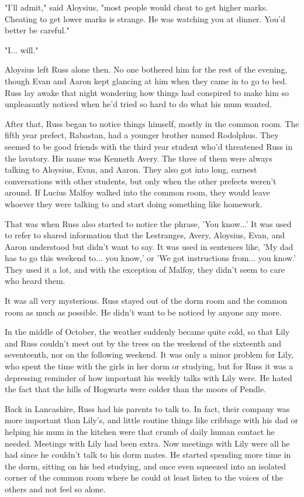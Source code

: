 \documentclass[a4paper,11pt]{article}
\begin{document}
"I'll admit," said Aloysius, "most people would cheat to get higher marks. Cheating to get lower marks is strange. He was watching you at dinner. You'd better be careful."

"I... will."

Aloysius left Russ alone then. No one bothered him for the rest of the evening, though Evan and Aaron kept glancing at him when they came in to go to bed. Russ lay awake that night wondering how things had conspired to make him so unpleasantly noticed when he'd tried so hard to do what his mum wanted.

After that, Russ began to notice things himself, mostly in the common room. The fifth year prefect, Rabastan, had a younger brother named Rodolphus. They seemed to be good friends with the third year student who'd threatened Russ in the lavatory. His name was Kenneth Avery. The three of them were always talking to Aloysius, Evan, and Aaron. They also got into long, earnest conversations with other students, but only when the other prefects weren't around. If Lucius Malfoy walked into the common room, they would leave whoever they were talking to and start doing something like homework.

That was when Russ also started to notice the phrase, 'You know...' It was used to refer to shared information that the Lestranges, Avery, Aloysius, Evan, and Aaron understood but didn't want to say. It was used in sentences like, 'My dad has to go this weekend to... you know,' or 'We got instructions from... you know.' They used it a lot, and with the exception of Malfoy, they didn't seem to care who heard them.

It was all very mysterious. Russ stayed out of the dorm room and the common room as much as possible. He didn't want to be noticed by anyone any more.

In the middle of October, the weather suddenly became quite cold, so that Lily and Russ couldn't meet out by the trees on the weekend of the sixteenth and seventeenth, nor on the following weekend. It was only a minor problem for Lily, who spent the time with the girls in her dorm or studying, but for Russ it was a depressing reminder of how important his weekly talks with Lily were. He hated the fact that the hills of Hogwarts were colder than the moors of Pendle.

Back in Lancashire, Russ had his parents to talk to. In fact, their company was more important than Lily's, and little routine things like cribbage with his dad or helping his mum in the kitchen were that crumb of daily human contact he needed. Meetings with Lily had been extra. Now meetings with Lily were all he had since he couldn't talk to his dorm mates. He started spending more time in the dorm, sitting on his bed studying, and once even squeezed into an isolated corner of the common room where he could at least listen to the voices of the others and not feel so alone.
\end{document}
